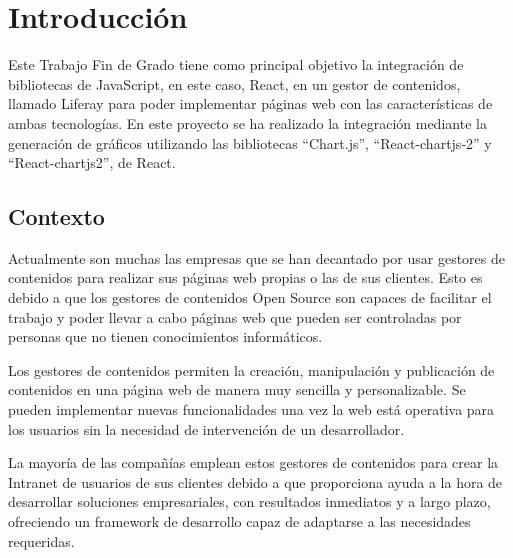 \documentclass[a4paper, 12pt]{book}
\begin{document}
\tableofcontents 
\cleardoublepage
\listoffigures %




\cleardoublepage
\chapter{Introducci\'on}
\label{sec:intro} %

Este Trabajo Fin de Grado tiene como principal objetivo la integración de bibliotecas de JavaScript, en este caso, React, en un gestor de contenidos, llamado Liferay para poder implementar páginas web con las características de ambas tecnologías. En este proyecto se ha realizado la integración mediante la generación de gráficos utilizando las bibliotecas “Chart.js”, “React-chartjs-2” y “React-chartjs2”, de React.


\section{Contexto}
\label{sec:contexto}
Actualmente son muchas las empresas que se han decantado por usar gestores de contenidos para realizar sus páginas web propias o las de sus clientes. Esto es debido a que los gestores de contenidos Open Source son capaces de facilitar el trabajo y poder llevar a cabo páginas web que pueden ser controladas por personas que no tienen conocimientos informáticos.

\vspace{5mm} %
Los gestores de contenidos permiten la creación, manipulación y publicación de contenidos en una página web de manera muy sencilla y personalizable. Se pueden implementar nuevas funcionalidades una vez la web está operativa para los usuarios sin la necesidad de intervención de un desarrollador.

\vspace{5mm} %
La mayoría de las compañías emplean estos gestores de contenidos para crear la Intranet de usuarios de sus clientes debido a que proporciona ayuda a la hora de desarrollar soluciones empresariales, con resultados inmediatos y a largo plazo, ofreciendo un framework de desarrollo capaz de adaptarse a las necesidades requeridas.
\end{document}
